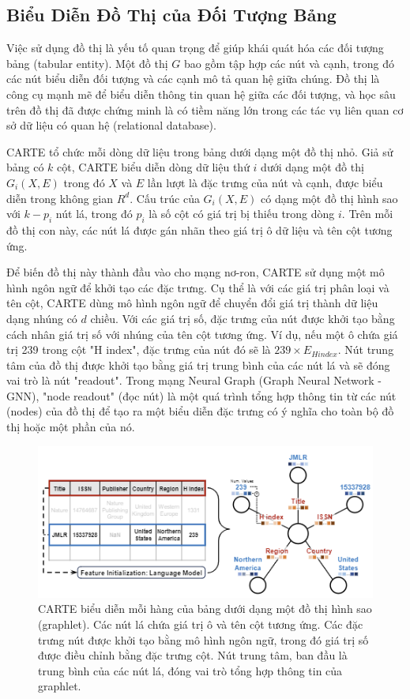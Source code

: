 \documentclass{article}
\begin{document}
\subsection{Biểu Diễn Đồ Thị của Đối Tượng Bảng}
Việc sử dụng đồ thị là yếu tố quan trọng để giúp khái quát hóa các đối tượng bảng (tabular entity). Một đồ thị $G$ bao gồm tập hợp các nút và cạnh, trong đó các nút biểu diễn đối tượng và các cạnh mô tả quan hệ giữa chúng. Đồ thị là công cụ mạnh mẽ để biểu diễn thông tin quan hệ giữa các đối tượng, và học sâu trên đồ thị đã được chứng minh là có tiềm năng lớn trong các tác vụ liên quan cơ sở dữ liệu có quan hệ (relational database).

CARTE tổ chức mỗi dòng dữ liệu trong bảng dưới dạng một đồ thị nhỏ. Giả sử bảng có $k$ cột, CARTE biểu diễn dòng dữ liệu thứ $i$ dưới dạng một đồ thị $G_i(X,E)$ trong đó $X$ và $E$ lần lượt là đặc trưng của nút và cạnh, được biểu diễn trong không gian $R^d$. Cấu trúc của $G_i(X,E)$ có dạng một đồ thị hình sao với $k-p_i$ nút lá, trong đó $p_i$ là số cột có giá trị bị thiếu trong dòng $i$. Trên mỗi đồ thị con này, các nút lá được gán nhãn theo giá trị ô dữ liệu và tên cột tương ứng.

Để biến đồ thị này thành đầu vào cho mạng nơ-ron, CARTE sử dụng một mô hình ngôn ngữ để khởi tạo các đặc trưng. Cụ thể là với các giá trị phân loại và tên cột, CARTE dùng mô hình ngôn ngữ để chuyển đổi giá trị thành dữ liệu dạng nhúng có $d$ chiều. Với các giá trị số, đặc trưng của nút được khởi tạo bằng cách nhân giá trị số với nhúng của tên cột tương ứng. Ví dụ, nếu một ô chứa giá trị 239 trong cột "H index", đặc trưng của nút đó sẽ là $239 \times E_{H index}$. Nút trung tâm của đồ thị được khởi tạo bằng giá trị trung bình của các nút lá và sẽ đóng vai trò là nút "readout". Trong mạng Neural Graph (Graph Neural Network - GNN), "node readout" (đọc nút) là một quá trình tổng hợp thông tin từ các nút (nodes) của đồ thị để tạo ra một biểu diễn đặc trưng có ý nghĩa cho toàn bộ đồ thị hoặc một phần của nó. 

\begin{figure} 
    \centering
    \includegraphics[scale = 1]{graphlet_representation_of_tabular_entity.png}
    \caption{CARTE biểu diễn mỗi hàng của bảng dưới dạng một đồ thị hình sao (graphlet). Các nút lá chứa giá trị ô và tên cột tương ứng. Các đặc trưng nút được khởi tạo bằng mô hình ngôn ngữ, trong đó giá trị số được điều chỉnh bằng đặc trưng cột. Nút trung tâm, ban đầu là trung bình của các nút lá, đóng vai trò tổng hợp thông tin của graphlet.}
    \label{fig:graphlet_representation_of_tabular_entity}
\end{figure}
\end{document}
